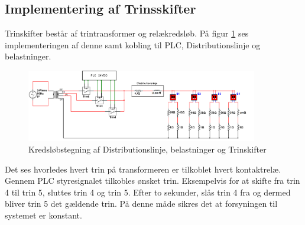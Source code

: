 \subsection{Implementering af Trinsskifter}

Trinskifter består af trintransformer og relækredsløb. På figur \ref{fig:Trinskift} ses implementeringen af denne samt kobling til PLC, Distributionslinje og belastninger.

\begin{figure}[H]
	\centering
	\includegraphics[width=0.9\textwidth]{figure/Trinskiftertegning2}
	\caption{Kredsløbstegning af Distributionslinje, belastninger og Trinskifter}
	\label{fig:Trinskift}
\end{figure}

Det ses hvorledes hvert trin på transformeren er tilkoblet hvert kontaktrelæ. Gennem PLC styresignalet tilkobles ønsket trin. Eksempelvis for at skifte fra trin 4 til trin 5, sluttes trin 4 og trin 5. Efter to sekunder, slås trin 4 fra og dermed bliver trin 5 det gældende trin. På denne måde sikres det at forsyningen til systemet er konstant.  



